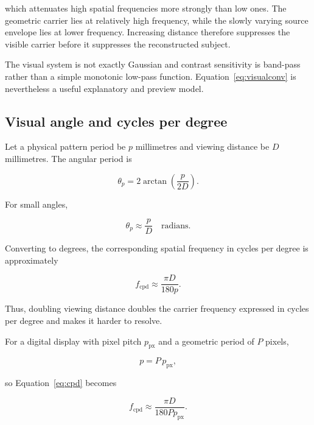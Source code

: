 which attenuates high spatial frequencies more strongly than low ones. The geometric carrier lies at relatively high frequency, while the slowly varying source envelope lies at lower frequency. Increasing distance therefore suppresses the visible carrier before it suppresses the reconstructed subject.

The visual system is not exactly Gaussian and contrast sensitivity is band-pass rather than a simple monotonic low-pass function. Equation~\eqref{eq:visualconv} is nevertheless a useful explanatory and preview model.

\subsection{Visual angle and cycles per degree}

Let a physical pattern period be $p$ millimetres and viewing distance be $D$ millimetres. The angular period is

\begin{equation}
\theta_p=2\arctan\!\left(\frac{p}{2D}\right).
\label{eq:angularperiod}
\end{equation}

For small angles,

\begin{equation}
\theta_p\approx\frac{p}{D}\quad\text{radians}.
\end{equation}

Converting to degrees, the corresponding spatial frequency in cycles per degree is approximately

\begin{equation}
f_{\mathrm{cpd}}
\approx
\frac{\pi D}{180p}.
\label{eq:cpd}
\end{equation}

Thus, doubling viewing distance doubles the carrier frequency expressed in cycles per degree and makes it harder to resolve.

For a digital display with pixel pitch $p_{\mathrm{px}}$ and a geometric period of $P$ pixels,

\begin{equation}
p=P\,p_{\mathrm{px}},
\end{equation}

so Equation~\eqref{eq:cpd} becomes

\begin{equation}
f_{\mathrm{cpd}}
\approx
\frac{\pi D}{180Pp_{\mathrm{px}}}.
\label{eq:cpddisplay}
\end{equation}

